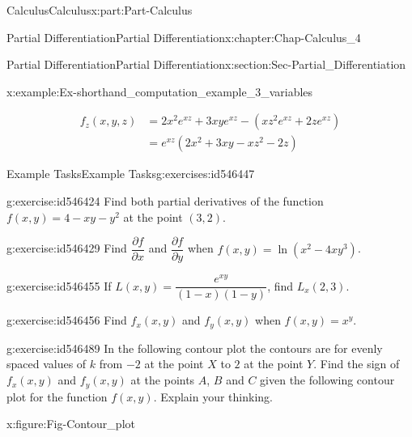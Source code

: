 \documentclass[oneside,10pt,]{book}
\numberwithin{equation}{section}
\newcommand{\amp}{&}
\begin{document}
\begin{partptx}{Calculus}{}{Calculus}{}{}{x:part:Part-Calculus}
\begin{chapterptx}{Partial Differentiation}{}{Partial Differentiation}{}{}{x:chapter:Chap-Calculus_4}
\begin{sectionptx}{Partial Differentiation}{}{Partial Differentiation}{}{}{x:section:Sec-Partial_Differentiation}
\begin{example}{}{x:example:Ex-shorthand_computation_example_3_variables}
\par
%
\begin{align*}
f_z(x,y,z) \amp = 2x^2 e^{xz} + 3xye^{xz} - (xz^2e^{xz} + 2ze^{xz} )\\
\amp = e^{xz} (2x^2 + 3xy - xz^2 - 2z)
\end{align*}
%
\end{example}
%
%
\typeout{************************************************}
\typeout{************************************************}
%
\begin{exercises-subsection-numberless}{Example Tasks}{}{Example Tasks}{}{}{g:exercises:id546447}
\begin{divisionexercise}{1}{}{}{g:exercise:id546424}%
Find both partial derivatives of the function \(f(x,y)=4-xy-y^2\) at the point \((3,2)\).%
\end{divisionexercise}%
\begin{divisionexercise}{2}{}{}{g:exercise:id546429}%
Find \(\dfrac{\partial f}{\partial x}\) and \(\dfrac{\partial f}{\partial y}\) when \(f(x,y) = \ln(x^2-4xy^3)\).%
\end{divisionexercise}%
\begin{divisionexercise}{3}{}{}{g:exercise:id546455}%
If \(L(x,y) = \dfrac{e^{xy}}{(1-x)(1-y)}\), find \(L_x(2,3)\).%
\end{divisionexercise}%
\begin{divisionexercise}{4}{}{}{g:exercise:id546456}%
Find \(f_x(x,y)\) and \(f_y(x,y)\) when \(f(x,y) = x^y\).%
\end{divisionexercise}%
\begin{divisionexercise}{5}{}{}{g:exercise:id546489}%
In the following contour plot the contours are for evenly spaced values of \(k\) from \(-2\) at the point \(X\) to \(2\) at the point \(Y\). Find the sign of \(f_x(x,y)\) and \(f_y(x,y)\) at the points \(A\), \(B\) and \(C\) given the following contour plot for the function \(f(x,y)\). Explain your thinking.%
\begin{figureptx}{}{x:figure:Fig-Contour_plot}{}%
\begin{image}{0.15}{0.7}{0.15}%

\end{image}
\end{figureptx}
\end{divisionexercise}
\end{exercises-subsection-numberless}
\end{sectionptx}
\end{chapterptx}
\end{partptx}
\end{document}
